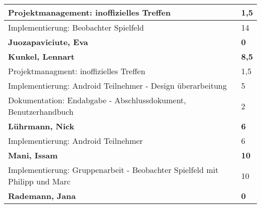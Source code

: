 \documentclass[a4paper,11pt]{scrartcl}
\begin{document}
\begin{longtable}{| p{13.8cm} | C{2.4cm} |}
	Projektmanagement: inoffizielles Treffen
	&
	1,5
	\\
	\hline

	Implementierung: Beobachter Spielfeld
	&
	14
	\\
	\hline
	\hline


	\textbf{Juozapaviciute, Eva} & \textbf{0}\\ %
	\hline

	\hline
	\hline


	\textbf{Kunkel, Lennart} & \textbf{8,5}\\ %
	\hline

  Projektmanagment: inoffizielles Treffen
	&
  1,5
	\\
	\hline

  Implementierung: Android Teilnehmer - Design überarbeitung
	&
  5
	\\
	\hline

  Dokumentation: Endabgabe - Abschlussdokument, Benutzerhandbuch
	&
  2
	\\
	\hline
	\hline


	\textbf{Lührmann, Nick} & \textbf{6}\\ %
	\hline

	Implementierung: Android Teilnehmer
	&
	6
	\\
	\hline
	\hline


	\textbf{Mani, Issam} & \textbf{10}\\ %
	\hline

  Implementierung: Gruppenarbeit - Beobachter Spielfeld mit Philipp und Marc
	&
  10
	\\
	\hline
	\hline


	\textbf{Rademann, Jana} & \textbf{0}\\ %
	\hline


\end{longtable}
\end{document}
